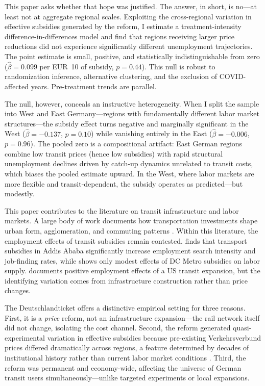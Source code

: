 \documentclass[12pt]{article}
\begin{document}
This paper asks whether that hope was justified. The answer, in short, is no---at least not at aggregate regional scales. Exploiting the cross-regional variation in effective subsidies generated by the reform, I estimate a treatment-intensity difference-in-differences model and find that regions receiving larger price reductions did not experience significantly different unemployment trajectories. The point estimate is small, positive, and statistically indistinguishable from zero ($\hat{\beta}=0.099$ per EUR~10 of subsidy, $p=0.44$). This null is robust to randomization inference, alternative clustering, and the exclusion of COVID-affected years. Pre-treatment trends are parallel.

The null, however, conceals an instructive heterogeneity. When I split the sample into West and East Germany---regions with fundamentally different labor market structures---the subsidy effect turns negative and marginally significant in the West ($\hat{\beta}=-0.137$, $p=0.10$) while vanishing entirely in the East ($\hat{\beta}=-0.006$, $p=0.96$). The pooled zero is a compositional artifact: East German regions combine low transit prices (hence low subsidies) with rapid structural unemployment declines driven by catch-up dynamics unrelated to transit costs, which biases the pooled estimate upward. In the West, where labor markets are more flexible and transit-dependent, the subsidy operates as predicted---but modestly.

This paper contributes to the literature on transit infrastructure and labor markets. A large body of work documents how transportation investments shape urban form, agglomeration, and commuting patterns \citep{ahlfeldt2015economics, duranton2012urban, monte2018commuting, redding2017quantitative}. Within this literature, the employment effects of transit subsidies remain contested. \citet{franklin2018location} finds that transport subsidies in Addis Ababa significantly increase employment search intensity and job-finding rates, while \citet{phillips2020transit} shows only modest effects of DC Metro subsidies on labor supply. \citet{su2021impact} documents positive employment effects of a US transit expansion, but the identifying variation comes from infrastructure construction rather than price changes.

The Deutschlandticket offers a distinctive empirical setting for three reasons. First, it is a \textit{price} reform, not an infrastructure expansion---the rail network itself did not change, isolating the cost channel. Second, the reform generated quasi-experimental variation in effective subsidies because pre-existing Verkehrsverbund prices differed dramatically across regions, a feature determined by decades of institutional history rather than current labor market conditions \citep{buehler2017germany}. Third, the reform was permanent and economy-wide, affecting the universe of German transit users simultaneously---unlike targeted experiments or local expansions.
\end{document}
